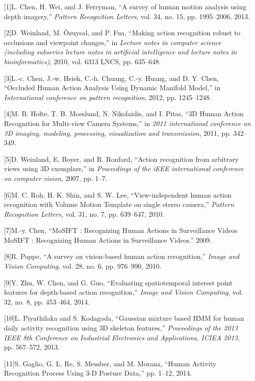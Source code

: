 {[}1{]}L. Chen, H. Wei, and J. Ferryman, ``A survey of human motion
analysis using depth imagery,'' \emph{Pattern Recognition Letters}, vol.
34, no. 15, pp. 1995--2006, 2013.

{[}2{]}D. Weinland, M. Özuysal, and P. Fua, ``Making action recognition
robust to occlusions and viewpoint changes,'' in \emph{Lecture notes in
computer science (including subseries lecture notes in artificial
intelligence and lecture notes in bioinformatics)}, 2010, vol. 6313
LNCS, pp. 635--648.

{[}3{]}L.-c. Chen, J.-w. Hsieh, C.-h. Chuang, C.-y. Huang, and D. Y.
Chen, ``Occluded Human Action Analysis Using Dynamic Manifold Model,''
in \emph{International conference on pattern recognition}, 2012, pp.
1245--1248.

{[}4{]}M. B. Holte, T. B. Moeslund, N. Nikolaidis, and I. Pitas, ``3D
Human Action Recognition for Multi-view Camera Systems,'' in \emph{2011
international conference on 3D imaging, modeling, processing,
visualization and transmission}, 2011, pp. 342--349.

{[}5{]}D. Weinland, E. Boyer, and R. Ronfard, ``Action recognition from
arbitrary views using 3D exemplars,'' in \emph{Proceedings of the iEEE
international conference on computer vision}, 2007, pp. 1--7.

{[}6{]}M. C. Roh, H. K. Shin, and S. W. Lee, ``View-independent human
action recognition with Volume Motion Template on single stereo
camera,'' \emph{Pattern Recognition Letters}, vol. 31, no. 7, pp.
639--647, 2010.

{[}7{]}M.-y. Chen, ``MoSIFT : Recognizing Human Actions in Surveillance
Videos MoSIFT : Recognizing Human Actions in Surveillance Videos.''
2009.

{[}8{]}R. Poppe, ``A survey on vision-based human action recognition,''
\emph{Image and Vision Computing}, vol. 28, no. 6, pp. 976--990, 2010.

{[}9{]}Y. Zhu, W. Chen, and G. Guo, ``Evaluating spatiotemporal interest
point features for depth-based action recognition,'' \emph{Image and
Vision Computing}, vol. 32, no. 8, pp. 453--464, 2014.

{[}10{]}L. Piyathilaka and S. Kodagoda, ``Gaussian mixture based HMM for
human daily activity recognition using 3D skeleton features,''
\emph{Proceedings of the 2013 IEEE 8th Conference on Industrial
Electronics and Applications, ICIEA 2013}, pp. 567--572, 2013.

{[}11{]}S. Gaglio, G. L. Re, S. Member, and M. Morana, ``Human Activity
Recognition Process Using 3-D Posture Data,'' pp. 1--12, 2014.

